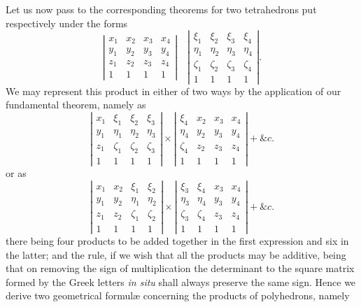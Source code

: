 \documentclass[11pt]{article}
\begin{document}
{{Let us now pass to the corresponding theorems for two tetrahedrons put respectively under the forms
\[
\left|\begin{array}{cccc}
x_1&x_2&x_3&x_4\\
y_1&y_2&y_3&y_4\\
z_1&z_2&z_3&z_4\\
1&1&1&1
\end{array}\right|
\quad
\left|\begin{array}{cccc}
\xi_1&\xi_2&\xi_3&\xi_4\\
\eta_1&\eta_2&\eta_3&\eta_4\\
\zeta_1&\zeta_2&\zeta_3&\zeta_4\\
1&1&1&1
\end{array}\right|.
\]
We may represent this product in either of two ways by the application of our fundamental theorem, namely as
\[
\left|\begin{array}{cccc}
x_1&\xi_1&\xi_2&\xi_3\\
y_1&\eta_1&\eta_2&\eta_3\\
z_1&\zeta_1&\zeta_2&\zeta_3\\
1&1&1&1
\end{array}\right|
\times
\left|\begin{array}{cccc}
\xi_4&x_2&x_3&x_4\\
\eta_4&y_2&y_3&y_4\\
\zeta_4&z_2&z_3&z_4\\
1&1&1&1
\end{array}\right|
+\&c.
\]
or as
\[
\left|\begin{array}{cccc}
x_1&x_2&\xi_1&\xi_2\\
y_1&y_2&\eta_1&\eta_2\\
z_1&z_2&\zeta_1&\zeta_2\\
1&1&1&1
\end{array}\right|
\times
\left|\begin{array}{cccc}
\xi_3&\xi_4&x_3&x_4\\
\eta_3&\eta_4&y_3&y_4\\
\zeta_3&\zeta_4&z_3&z_4\\
1&1&1&1
\end{array}\right|
+\&c.
\]
there being four products to be added together in the first expression and six in the latter; and the rule, if we wish that all the products may be additive, being that on removing the sign of multiplication the determinant to the square matrix formed by the Greek letters \emph{in situ} shall always preserve the same sign. Hence we derive two geometrical formulæ concerning the products of polyhedrons, namely
}}
\end{document}
